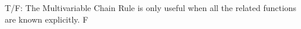 {T/F: The  Multivariable Chain Rule is only useful when all the related functions are known explicitly.
}
{F}
